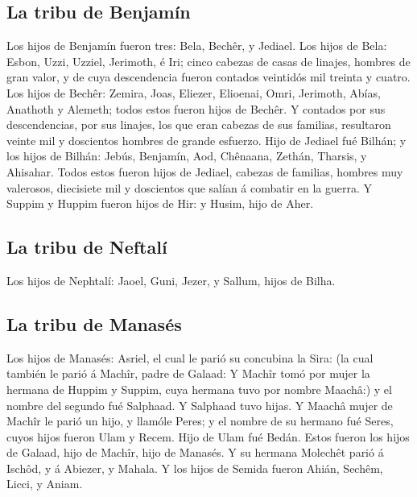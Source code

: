 \hypertarget{la-tribu-de-benjamuxedn}{%
\subsection{La tribu de Benjamín}\label{la-tribu-de-benjamuxedn}}

 Los hijos de Benjamín fueron tres: Bela, Bechêr, y
Jediael.  Los hijos de Bela: Esbon, Uzzi, Uzziel,
Jerimoth, é Iri; cinco cabezas de casas de linajes, hombres de gran
valor, y de cuya descendencia fueron contados veintidós mil treinta y
cuatro.  Los hijos de Bechêr: Zemira, Joas, Eliezer,
Elioenai, Omri, Jerimoth, Abías, Anathoth y Alemeth; todos estos fueron
hijos de Bechêr.  Y contados por sus descendencias, por
sus linajes, los que eran cabezas de sus familias, resultaron veinte mil
y doscientos hombres de grande esfuerzo.  Hijo de Jediael
fué Bilhán; y los hijos de Bilhán: Jebús, Benjamín, Aod, Chênaana,
Zethán, Tharsis, y Ahisahar.  Todos estos fueron hijos de
Jediael, cabezas de familias, hombres muy valerosos, diecisiete mil y
doscientos que salían á combatir en la guerra.  Y Suppim
y Huppim fueron hijos de Hir: y Husim, hijo de Aher.

\hypertarget{la-tribu-de-neftaluxed}{%
\subsection{La tribu de Neftalí}\label{la-tribu-de-neftaluxed}}

 Los hijos de Nephtalí: Jaoel, Guni, Jezer, y Sallum,
hijos de Bilha.

\hypertarget{la-tribu-de-manasuxe9s}{%
\subsection{La tribu de Manasés}\label{la-tribu-de-manasuxe9s}}

 Los hijos de Manasés: Asriel, el cual le parió su
concubina la Sira: (la cual también le parió á Machîr, padre de Galaad:
 Y Machîr tomó por mujer la hermana de Huppim y Suppim,
cuya hermana tuvo por nombre Maachâ:) y el nombre del segundo fué
Salphaad. Y Salphaad tuvo hijas.  Y Maachâ mujer de
Machîr le parió un hijo, y llamóle Peres; y el nombre de su hermano fué
Seres, cuyos hijos fueron Ulam y Recem.  Hijo de Ulam fué
Bedán. Estos fueron los hijos de Galaad, hijo de Machîr, hijo de
Manasés.  Y su hermana Molechêt parió á Ischôd, y á
Abiezer, y Mahala.  Y los hijos de Semida fueron Ahián,
Sechêm, Licci, y Aniam.

